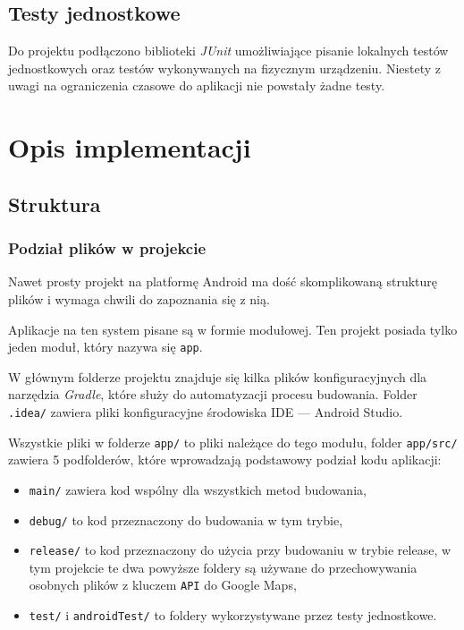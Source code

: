 \documentclass[polish,polish,a4paper,12pt]{article}
\let\sectioncmd\section
\renewcommand{\section}{\clearpage\sectioncmd}
\begin{document}
	\subsection{Testy jednostkowe}

	Do projektu podłączono biblioteki \textit{JUnit} umożliwiające pisanie lokalnych testów jednostkowych oraz testów wykonywanych na fizycznym urządzeniu. Niestety z uwagi na ograniczenia czasowe do aplikacji nie powstały żadne testy.

\section{Opis implementacji}\label{implementation}
	\subsection{Struktura}
		\subsubsection{Podział plików w projekcie}

		Nawet prosty projekt na platformę Android ma dość skomplikowaną strukturę plików i wymaga chwili do zapoznania się z nią.

		Aplikacje na ten system pisane są w formie modułowej. Ten projekt posiada tylko jeden moduł, który nazywa się \texttt{app}.

		W głównym folderze projektu znajduje się kilka plików konfiguracyjnych dla narzędzia \textit{Gradle}, które służy do automatyzacji procesu budowania. Folder \texttt{.idea/} zawiera pliki konfiguracyjne środowiska IDE — Android Studio.

		Wszystkie pliki w folderze \texttt{app/} to pliki należące do tego modułu, folder \texttt{app/src/} zawiera 5 podfolderów, które wprowadzają podstawowy podział kodu aplikacji:

		\begin{itemize}
			\item \texttt{main/} zawiera kod wspólny dla wszystkich metod budowania,
			\item \texttt{debug/} to kod przeznaczony do budowania w tym trybie,
			\item \texttt{release/} to kod przeznaczony do użycia przy budowaniu w trybie release, w tym projekcie te dwa powyższe foldery są używane do przechowywania osobnych plików z kluczem \texttt{API} do Google Maps,
			\item \texttt{test/} i \texttt{androidTest/} to foldery wykorzystywane przez testy jednostkowe.
		\end{itemize}
\end{document}
